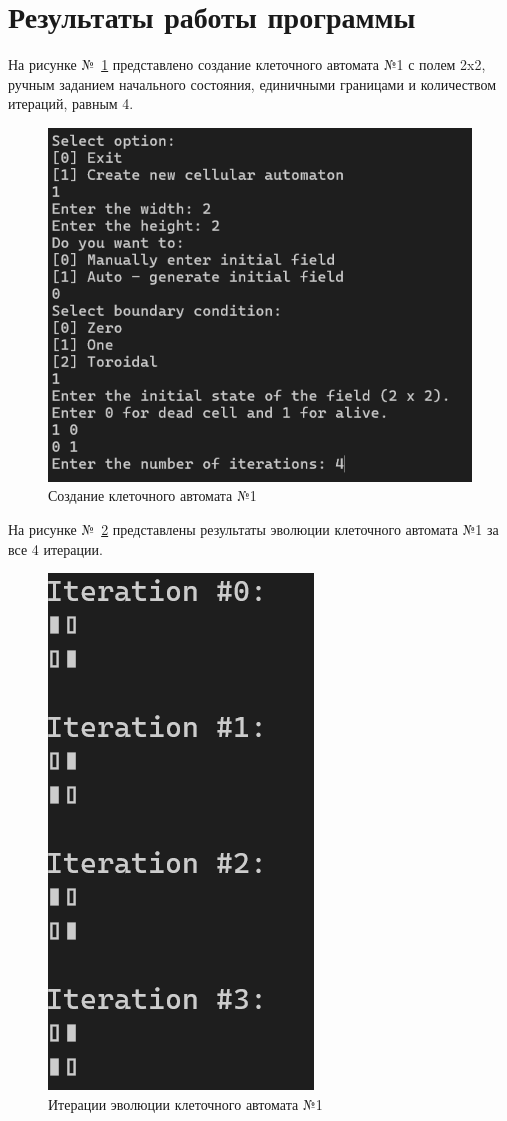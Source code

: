 \documentclass[a4paper, final]{article}
\begin{document}
\section{Результаты работы программы}
На рисунке №~\ref{img:example1} представлено создание клеточного автомата №1 с полем 2x2, ручным заданием начального
состояния, единичными границами и количеством итераций, равным 4.
\begin{figure}[H]
   \centering
   \includegraphics[scale=0.6]{example1.png}
   \caption{Создание клеточного автомата №1}
   \label{img:example1}
\end{figure}

На рисунке №~\ref{img:example1_res} представлены результаты эволюции клеточного автомата №1 за все 4 итерации.

\begin{figure}[H]
  \centering
  \includegraphics[scale=0.6]{example1_res.png}
  \caption{Итерации эволюции клеточного автомата №1}
  \label{img:example1_res}
\end{figure}
\end{document}
